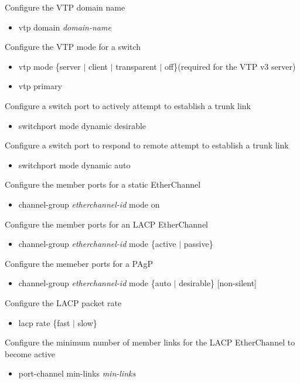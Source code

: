 \documentclass{article}
\begin{document}
Configure the VTP domain name
\begin{itemize}
\item vtp domain \textit{domain-name}
\end{itemize}

Configure the VTP mode for a switch
\begin{itemize}
\item vtp mode \{server $|$ client $|$ transparent $|$ off\}(required for the VTP v3 server)
\item vtp primary
\end{itemize}

Configure a switch port to actively attempt to establish a trunk link
\begin{itemize}
\item switchport mode dynamic desirable
\end{itemize}

Configure a switch port to respond to remote attempt to establish a trunk link
\begin{itemize}
\item switchport mode dynamic auto
\end{itemize}

Configure the member ports for a static EtherChannel
\begin{itemize}
\item channel-group \textit{etherchannel-id} mode on
\end{itemize}

Configure the member ports for an LACP EtherChannel
\begin{itemize}
\item channel-group \textit{etherchannel-id} mode \{active $|$ passive\}
\end{itemize}

Configure the memeber ports for a PAgP
\begin{itemize}
\item channel-group \textit{etherchannel-id} mode \{auto $|$ desirable\} [non-silent]
\end{itemize}

Configure the LACP packet rate
\begin{itemize}
\item lacp rate \{fast $|$ slow\}
\end{itemize}

Configure the minimum number of member links for the LACP EtherChannel to become active
\begin{itemize}
\item port-channel min-links \textit{min-links}
\end{itemize}
\end{document}
